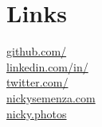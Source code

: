\documentclass[]{resume-openfont}
\begin{document}
\begin{minipage}[t]{0.26\textwidth}

\section{\textcolor{primary5}{Links}}
\href{https://github.com/nickysemenza}{github.com/} \\
\href{https://www.linkedin.com/in/nickysemenza}{linkedin.com/in/} \\
\href{https://twitter.com/nickysemenza}{twitter.com/} \\
\href{https://nickysemenza.com}{nickysemenza.com} \\
\href{https://nicky.photos}{nicky.photos} \\
\sectionsep



%
%

\end{minipage} 
\hfill
\end{document}

